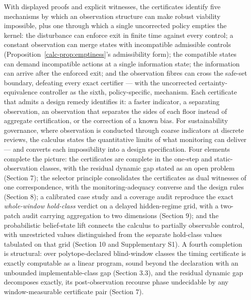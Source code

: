 \documentclass[10pt,twocolumn]{article}
\theoremstyle{definition}
\begin{document}
With displayed proofs and explicit witnesses, the certificates identify
five mechanisms by which an observation structure can make robust
viability impossible, plus one through which a single uncorrected policy
empties the kernel: the disturbance can enforce exit in finite time
against every control; a constant observation can merge states with
incompatible admissible controls (Proposition~\ref{calc-prop:emptiness}'s admissibility form);
the compatible states can demand incompatible actions at a single
information state; the information can arrive after the enforced exit;
and the observation fibres can cross the safe-set boundary, defeating
every exact certifier --- with the uncorrected certainty-equivalence controller as the
sixth, policy-specific, mechanism. Each certificate that admits a design
remedy identifies it: a faster indicator, a separating observation, an
observation that separates the sides of each floor instead of aggregate
certification, or the correction of a known bias. For sustainability
governance, where observation is conducted through coarse indicators at
discrete reviews, the calculus states the quantitative limits of what
monitoring can deliver --- and converts each impossibility into a design
specification. Four elements complete the picture: the certificates are complete in the one-step and static-observation classes, with the residual dynamic gap stated as an open problem (Section 7); the selector principle consolidates the certificates as dual witnesses of one correspondence, with the monitoring-adequacy converse and the design rules (Section 8); a calibrated case study and a coverage audit reproduce the exact \emph{whole-window hold-class} verdict on a delayed hidden-regime grid, with a two-patch audit carrying aggregation to two dimensions (Section 9); and the probabilistic belief-state lift connects the calculus to partially observable control, with unrestricted values distinguished from the separate hold-class values tabulated on that grid (Section 10 and Supplementary S1). A fourth completion is structural: over polytope-declared
blind-window classes the timing certificate is exactly computable as a linear
program, sound beyond the declaration with an unbounded implementable-class gap
(Section 3.3), and the residual dynamic gap decomposes exactly, its
post-observation recourse phase undecidable by any window-measurable certificate
pair (Section 7).
\end{document}
